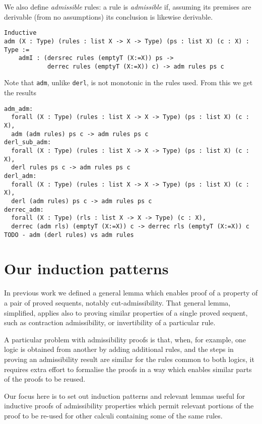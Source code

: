 \documentclass[a4paper,12pt]{llncs}
\begin{document}
We also define \emph{admissible} rules:
a rule is \emph{admissible} if, assuming its premises
are derivable (from no assumptions) its conclusion is
likewise derivable.

\begin{verbatim}
Inductive
adm (X : Type) (rules : list X -> X -> Type) (ps : list X) (c : X) : Type :=
    admI : (dersrec rules (emptyT (X:=X)) ps ->
            derrec rules (emptyT (X:=X)) c) -> adm rules ps c
\end{verbatim}

Note that \texttt{adm}, unlike \texttt{derl}, is not monotonic in the
rules used.
From this we get the results 
\begin{verbatim}
adm_adm:
  forall (X : Type) (rules : list X -> X -> Type) (ps : list X) (c : X),
  adm (adm rules) ps c -> adm rules ps c
derl_sub_adm:
  forall (X : Type) (rules : list X -> X -> Type) (ps : list X) (c : X),
  derl rules ps c -> adm rules ps c
derl_adm:
  forall (X : Type) (rules : list X -> X -> Type) (ps : list X) (c : X),
  derl (adm rules) ps c -> adm rules ps c
derrec_adm:
  forall (X : Type) (rls : list X -> X -> Type) (c : X),
  derrec (adm rls) (emptyT (X:=X)) c -> derrec rls (emptyT (X:=X)) c
TODO - adm (derl rules) vs adm rules
\end{verbatim}

\section{Our induction patterns}
In previous work we defined a general lemma which enables proof of a property
of a pair of proved sequents, notably cut-admissibility.
That general lemma, simplified, applies also to proving similar properties of a
single proved sequent, such as contraction admissibility, or invertibility of
a particular rule.

A particular problem with admissibility proofs is that, when, for example,
one logic is obtained from another by adding additional rules,
and the steps in proving an admissibility result
are similar for the rules common to both logics, it requires extra effort
to formalise the proofs in a way which enables similar parts of the proofs to
be reused.

Our focus here is to set out induction patterns and relevant lemmas
useful for inductive proofs of admissibility properties which permit relevant
portions of the proof to be re-used for other calculi containing some of the
same rules.
\end{document}
